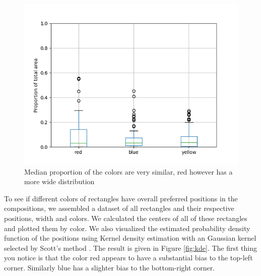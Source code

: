 \documentclass[serif,article,noparskip]{agse-thesis}
\begin{document}
\begin{figure} \includegraphics[width=\linewidth]{images/colors-rby.png}
\caption{Median proportion of the colors are very similar, red however has a
more wide distribution} \label{fig:colors-rby} \end{figure}

To see if different colors of rectangles have overall preferred positions in the
compositions, we assembled a dataset of all rectangles and their respective
positions, width and colors. We calculated the centers of all of these
rectangles and plotted them by color. We also visualized the estimated
probability density function of the positions using Kernel density estimation
with an Gaussian kernel selected by Scott's method \cite{Terrell1992}. The
result is given in Figure \ref{fig:kde}. The first thing you notice is that the
color red appears to have a substantial bias to the top-left corner. Similarly
blue has a slighter bias to the bottom-right corner.
\end{document}
